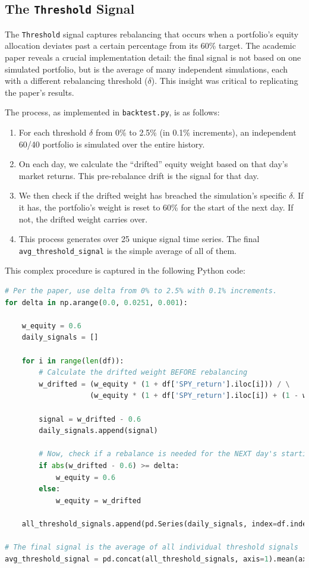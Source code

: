 \documentclass{article}
\begin{document}
\subsection{The \texttt{Threshold} Signal}
The \texttt{Threshold} signal captures rebalancing that occurs when a portfolio's equity allocation deviates past a certain percentage from its 60\% target. The academic paper reveals a crucial implementation detail: the final signal is not based on one simulated portfolio, but is the average of many independent simulations, each with a different rebalancing threshold ($\delta$). This insight was critical to replicating the paper's results.

The process, as implemented in \texttt{backtest.py}, is as follows:
\begin{enumerate}
    \item For each threshold $\delta$ from 0\% to 2.5\% (in 0.1\% increments), an independent 60/40 portfolio is simulated over the entire history.
    \item On each day, we calculate the ``drifted'' equity weight based on that day's market returns. This pre-rebalance drift is the signal for that day.
    \item We then check if the drifted weight has breached the simulation's specific $\delta$. If it has, the portfolio's weight is reset to 60\% for the start of the next day. If not, the drifted weight carries over.
    \item This process generates over 25 unique signal time series. The final \texttt{avg\_threshold\_signal} is the simple average of all of them.
\end{enumerate}

This complex procedure is captured in the following Python code:
\begin{lstlisting}[language=Python, caption={Definitive Threshold Signal Calculation from backtest.py}]
# Per the paper, use delta from 0% to 2.5% with 0.1% increments.
for delta in np.arange(0.0, 0.0251, 0.001):
    
    w_equity = 0.6
    daily_signals = []

    for i in range(len(df)):
        # Calculate the drifted weight BEFORE rebalancing
        w_drifted = (w_equity * (1 + df['SPY_return'].iloc[i])) / \
                    (w_equity * (1 + df['SPY_return'].iloc[i]) + (1 - w_equity) * (1 + df['TLT_return'].iloc[i]))
        
        signal = w_drifted - 0.6
        daily_signals.append(signal)
        
        # Now, check if a rebalance is needed for the NEXT day's starting weight
        if abs(w_drifted - 0.6) >= delta:
            w_equity = 0.6
        else:
            w_equity = w_drifted
    
    all_threshold_signals.append(pd.Series(daily_signals, index=df.index))

# The final signal is the average of all individual threshold signals
avg_threshold_signal = pd.concat(all_threshold_signals, axis=1).mean(axis=1)
\end{lstlisting}
\end{document}
